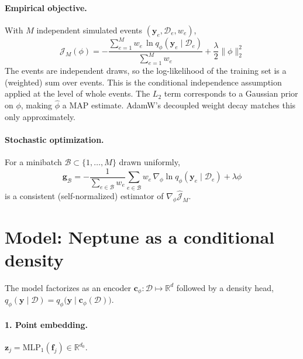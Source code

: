 \documentclass[11pt]{article}
\theoremstyle{definition}
\newcommand{\D}{\mathcal{D}}
\newcommand{\y}{\bm{y}}
\newcommand{\R}{\mathbb{R}}
\begin{document}
\paragraph{Empirical objective.}
With $M$ independent simulated events $(\y_e,\D_e,w_e)$,
\begin{equation}
  \boxed{\;
  \hat{\mathcal{J}}_M(\phi) = -\frac{\sum_{e=1}^{M} w_e\,\ln q_\phi(\y_e\mid\D_e)}{\sum_{e=1}^{M} w_e}
  + \frac{\lambda}{2}\|\phi\|_2^2 \;}
  \label{eq:emp}
\end{equation}
The events are independent draws, so the log-likelihood of the training set is a (weighted)
sum over events. This is the conditional independence assumption applied at the level of whole
events. The $L_2$ term corresponds to a Gaussian prior on $\phi$, making $\hat\phi$ a MAP
estimate. AdamW's decoupled weight decay matches this only approximately.

\paragraph{Stochastic optimization.}
For a minibatch $\mathcal{B}\subset\{1,\dots,M\}$ drawn uniformly,
\begin{equation}
  \bm{g}_{\mathcal{B}} = -\frac{1}{\sum_{e\in\mathcal{B}} w_e}\sum_{e\in\mathcal{B}} w_e\,\nabla_\phi\ln q_\phi(\y_e\mid\D_e) + \lambda\phi
\end{equation}
is a consistent (self-normalized) estimator of $\nabla_\phi\hat{\mathcal{J}}_M$.

\section{Model: Neptune as a conditional density}

The model factorizes as an encoder $\bm{c}_\phi:\D\mapsto\R^{d}$ followed by a density head,
$q_\phi(\y\mid\D) = q_\phi\big(\y\mid\bm{c}_\phi(\D)\big)$.

\paragraph{1. Point embedding.} $\bm{z}_j = \mathrm{MLP}_1(\bm{f}_j)\in\R^{d_0}$.
\end{document}
